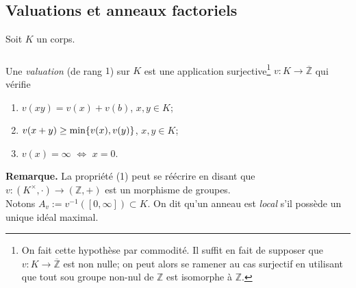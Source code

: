 \documentclass[a4paper, 12pt]{amsart}
\newcommand{\Z}{\mathbb{Z}}
\begin{document}
\subsection{Valuations et anneaux factoriels}\label{Val}Soit $K$ un corps.

\subsubsection{}\label{ValDef}Une \textit{valuation} (de rang $1$) sur $K$ est une application surjective\footnote{On fait cette hypoth\`ese par commodit\'e. Il suffit en fait de supposer que $v:K\rightarrow \overline{\Z}$ est non nulle; on peut alors se ramener au cas surjectif en utilisant que  tout sou groupe non-nul de $\Z$ est isomorphe \`a $\Z$.}
 $v:K\rightarrow \overline{\Z}$  qui v\'erifie
\begin{enumerate}
\item $v(xy)=v (x)+v (b)$, $x,y\in K$;
\item $v(x+y)\geq \hbox{\rm min}\lbrace v(x),v(y)\rbrace$, $x,y\in K$;
\item $v(x)=\infty$ $\Leftrightarrow$ $x=0$.
\end{enumerate}

\noindent\textbf{Remarque.}   La propri\'et\'e (1) peut se r\'e\'ecrire en disant que $v:(K^\times,\cdot)\rightarrow (\Z,+)$ est un morphisme de groupes.\\

\noindent Notons $A_v:=v^{-1}([0,\infty])\subset K$. On dit qu'un anneau   est \textit{local} s'il poss\`ede un unique id\'eal maximal.
 
\end{document}
